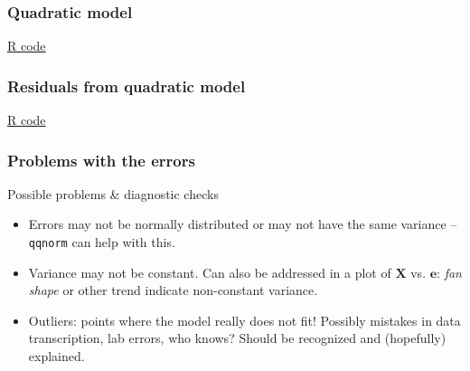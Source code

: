 \documentclass[handout]{beamer}
\begin{document}


   \begin{frame}
   \frametitle{Quadratic model}
   \begin{center}
   \end{center}
   \href{http://stats191.stanford.edu/simple_diagnostics.html#poorly-fitting-linear-model}{R code}
   \end{frame}



   \begin{frame}
   \frametitle{Residuals from quadratic model}
   \begin{center}
   \end{center}
   \href{http://stats191.stanford.edu/simple_diagnostics.html#poorly-fitting-linear-model}{R code}
   \end{frame}


   \begin{frame} \frametitle{Problems with the errors}

   \begin{block}
   {Possible problems \& diagnostic checks}
   \begin{itemize}

   \item
   Errors may not be normally distributed or may not have  the same variance -- {\tt qqnorm} can help with this.

   \item Variance may not be constant. Can also be addressed in a plot of
   $\pmb{X}$ vs. $\pmb{e}$: {\em fan shape} or other trend indicate
   non-constant variance.

   \item Outliers: points where the model really does not fit! Possibly mistakes in data transcription, lab errors, who knows? Should be recognized and (hopefully) explained.

   \end{itemize}
   \end{block}
   \end{frame}
\end{document}
